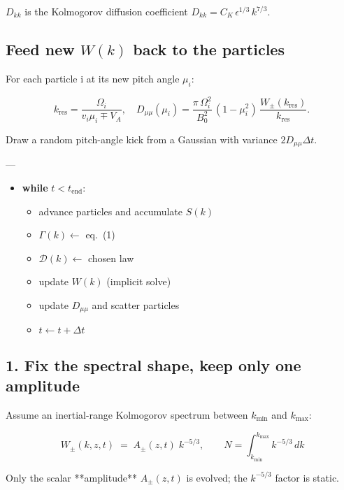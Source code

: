 $D_{kk}$ is the Kolmogorov diffusion coefficient
$D_{kk}=C_K\,\epsilon^{1/3}\,k^{7/3}$.

\subsection{Feed new $W(k)$ back to the particles}

For each particle i at its new pitch angle $\mu_i$:

$$
k_{\text{res}}  = \frac{\Omega_i}{v_i \mu_i \mp V_A},\quad
D_{\mu\mu}(\mu_i) = \frac{\pi\,\Omega_i^{2}}{B_0^{2}}\,(1-\mu_i^{2})\,
\frac{W_\pm(k_{\text{res}})}{k_{\text{res}}}.
$$

Draw a random pitch-angle kick from a Gaussian with variance $2D_{\mu\mu}\Delta t$.

---

\begin{tcolorbox}[colframe=black, colback=white, title=Time-Stepping Loop]
\begin{itemize}
    \item \textbf{while} \( t < t_{\text{end}} \):
    \begin{itemize}
        \item advance particles and accumulate \( S(k) \)
        \item \( \Gamma(k) \leftarrow \) eq.~(1)
        \item \( \mathcal{D}(k) \leftarrow \) chosen law
        \item update \( W(k) \) (implicit solve)
        \item update \( D_{\mu\mu} \) and scatter particles
        \item \( t \leftarrow t + \Delta t \)
    \end{itemize}
\end{itemize}
\end{tcolorbox}



\subsection{ 1.  Fix the spectral shape, keep only one amplitude}

Assume an inertial-range Kolmogorov spectrum between $k_{\min }$ and $k_{\max }$:

$$
\boxed{\,W_\pm(k,z,t)\;=\;A_\pm(z,t)\;k^{-5/3}},\qquad
N = \int_{k_{\min}}^{k_{\max}} k^{-5/3}\,dk
$$

Only the scalar **amplitude** $A_\pm(z,t)$ is evolved; the $k^{-5/3}$ factor is static.

